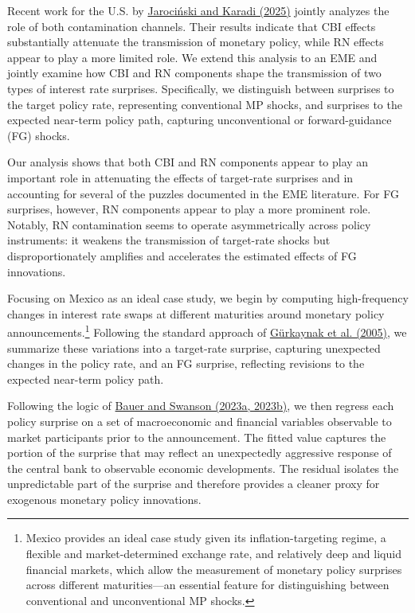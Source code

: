 \documentclass[12pt, reqno]{article}
\begin{document}
Recent work for the U.S. by \hyperlink{Jarociński and Karadi (2025)}{Jarociński and Karadi (2025)} jointly analyzes the role of both contamination channels. Their results indicate that CBI effects substantially attenuate the transmission of monetary policy, while RN effects appear to play a more limited role. We extend this analysis to an EME and jointly examine how CBI and RN components shape the transmission of two types of interest rate surprises. Specifically, we distinguish between surprises to the target policy rate, representing conventional MP shocks, and surprises to the expected near-term policy path, capturing unconventional or forward-guidance (FG) shocks.


Our analysis shows that both CBI and RN components appear to play an important role in attenuating the effects of target-rate surprises and in accounting for several of the puzzles documented in the EME literature. For FG surprises, however, RN components appear to play a more prominent role. Notably, RN contamination seems to operate asymmetrically across policy instruments: it weakens the transmission of target-rate shocks but disproportionately amplifies and accelerates the estimated effects of FG innovations.

Focusing on Mexico as an ideal case study, we begin by computing high-frequency changes in interest rate swaps at different maturities around monetary policy announcements.\footnote{Mexico provides an ideal case study given its inflation-targeting regime, a flexible and market-determined exchange rate, and relatively deep and liquid financial markets, which allow the measurement of monetary policy surprises across different maturities—an essential feature for distinguishing between conventional and unconventional MP shocks.} Following the standard approach of \hyperlink{Gürkaynak et al. (2005)}{Gürkaynak et al. (2005)}, we summarize these variations into a target-rate surprise, capturing unexpected changes in the policy rate, and an FG surprise, reflecting revisions to the expected near-term policy path.

Following the logic of \hyperlink{Bauer and Swanson (2023a, 2023b)}{Bauer and Swanson (2023a, 2023b)}, we then regress each policy surprise on a set of macroeconomic and financial variables observable to market participants prior to the announcement. The fitted value captures the portion of the surprise that may reflect an unexpectedly aggressive response of the central bank to observable economic developments. The residual isolates the unpredictable part of the surprise and therefore provides a cleaner proxy for exogenous monetary policy innovations.
\end{document}
